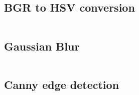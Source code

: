 \documentclass[a4paper, 10pt]{article}
\begin{document}

\subsection{BGR to HSV conversion}


\begin{lstlisting}[language = C++]

\end{lstlisting}


\subsection{Gaussian Blur}

%

\begin{lstlisting}[language = C++]

\end{lstlisting}


\subsection{Canny edge detection}

% 
\end{document}
